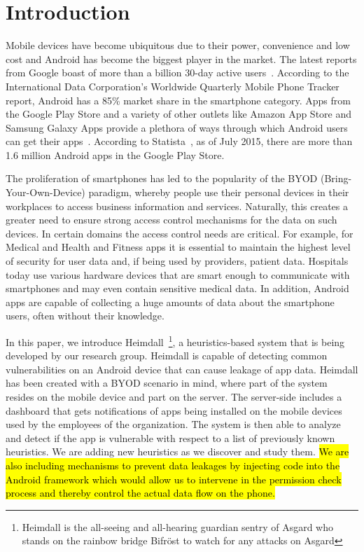 \section{Introduction}
\label{intro}
\noindent
Mobile devices have become ubiquitous due to their power, convenience and low cost and Android has become the biggest player in the market. The latest reports from Google boast of more than a billion 30-day active users~\cite{Engadget_market_share}. According to the International Data Corporation's Worldwide Quarterly Mobile Phone Tracker report, Android has a 85\% market share in the smartphone category. Apps from the Google Play Store and a variety of other outlets like Amazon App Store and Samsung Galaxy Apps provide a plethora of ways through which Android users can get their apps~\cite{Online_App_Stores}. According to Statista~\cite{Android_app_number}, as of July 2015, there are more than 1.6 million Android apps in the Google Play Store.

The proliferation of smartphones has led to the popularity of the BYOD (Bring-Your-Own-Device) paradigm, whereby people use their personal devices in their workplaces to access business information and services. Naturally, this creates a greater need to ensure strong access control mechanisms for the data on such devices. In certain domains the access control needs are critical. For example, for Medical and Health and Fitness apps it is essential to maintain the highest level of security for user data and, if being used by providers, patient data. Hospitals today use various hardware devices that are smart enough to communicate with smartphones and may even contain sensitive medical data. In addition, Android apps are capable of collecting a huge amounts of data about the smartphone users, often without their knowledge.

In this paper, we introduce Heimdall~\footnote{Heimdall is the all-seeing and all-hearing guardian sentry of Asgard who stands on the rainbow bridge Bifr\"{o}st to watch for any attacks on Asgard}, a heuristics-based system that is being developed by our research group. Heimdall is capable of detecting common vulnerabilities on an Android device that can cause leakage of app data. Heimdall has been created with a BYOD scenario in mind, where part of the system resides on the mobile device and part on the server. The server-side includes a dashboard that gets notifications of apps being installed on the mobile devices used by the employees of the organization. The system is then able to analyze and detect if the app is vulnerable with respect to a list of previously known heuristics. We are adding new heuristics as we discover and study them. \hl{We are also including mechanisms to prevent data leakages by injecting code into the Android framework which would allow us to intervene in the permission check process and thereby control the actual data flow on the phone.}

